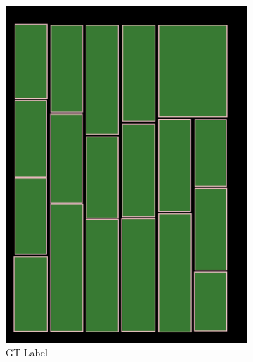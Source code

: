 \documentclass[aspectratio=1610]{beamer}
\begin{document}
\begin{frame}
\begin{figure}
\begin{subfigure}{.25\textwidth}
  \includegraphics[width=0.99\linewidth, clip=true, trim = 0mm 0mm 0mm 0mm]{figures/bbox/GQU6vjW.jpg}
  \caption{GT Label}
\end{subfigure}%
\begin{subfigure}{.25\textwidth}
  \centering

\end{subfigure}
\end{figure}
\end{frame}
\end{document}
